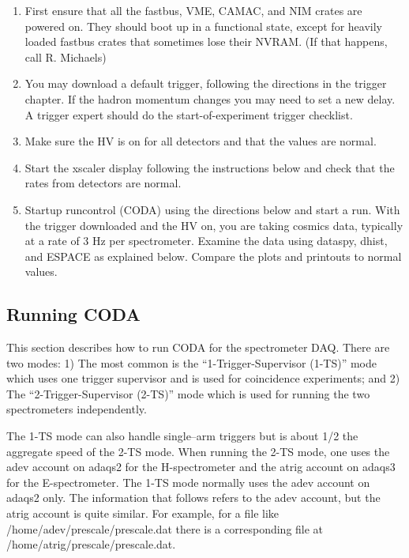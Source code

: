 \begin{enumerate}
\item{First ensure that all the fastbus, VME,
CAMAC, and NIM crates are powered
on. They should
boot up in a functional state, except for
heavily loaded fastbus crates that sometimes
lose their NVRAM.  (If that happens, call R. Michaels)}

\item{You may download
a default trigger, following the directions in
the trigger chapter.  If the hadron momentum changes
you may need to set a new delay.  A trigger expert
should do the start-of-experiment
trigger checklist.}

\item{Make sure the HV is on for all detectors
and that the values are normal.}

\item{Start the xscaler
display following the instructions below and
check that the rates from detectors are normal.}
 
\item{Startup runcontrol (CODA) using the directions below
and start a run.  With the trigger downloaded
and the HV on, you are taking cosmics data, typically at 
a rate of 3 Hz per spectrometer.  
Examine the data using dataspy,
dhist, and ESPACE as explained below.  Compare the
plots and printouts to normal values.}

\end{enumerate}

\subsection{Running CODA}

\par
This section describes how to run CODA for
the spectrometer DAQ.  There are two modes:
1) The most common is the ``1-Trigger-Supervisor (1-TS)''
mode which uses one trigger supervisor and
is used for coincidence experiments; and
2) The ``2-Trigger-Supervisor (2-TS)'' mode which
is used for running the two spectrometers
independently.

\par
The 1-TS mode can also handle single--arm
triggers but is about 1/2 the aggregate speed
of the 2-TS mode.  When running the 2-TS
mode, one uses the adev account on adaqs2 for the
H-spectrometer and the atrig account on adaqs3 for
the E-spectrometer.  
The 1-TS mode normally uses the 
adev account on adaqs2 only.
The information that follows refers to 
the adev account, but
the atrig account is quite similar.  For example,
for a file like /home/adev/prescale/prescale.dat
there is a corresponding file at
/home/atrig/prescale/prescale.dat.

